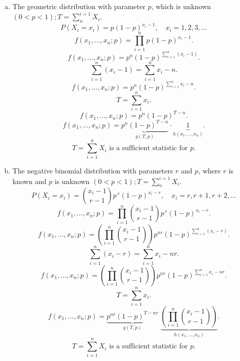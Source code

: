\documentclass{article}
\begin{document}
\begin{enumerate}[(a)]
	      \[
		      f(x_1,\dots,x_n; p)
		      =
		      \underbrace{p^{T}(1-p)^{n-T}}_{g(T,p)}
		      \cdot
		      \underbrace{1}_{h(x_1,\dots,x_n)}.
	      \]
	      \[
		      \boxed{
			      T = \sum_{i=1}^{n} X_i
			      \text{ is a sufficient statistic for } p.
		      }
	      \]
	\item The geometric distribution with parameter $p$, which is unknown $(0<p<1); T= \sum_{n}^{i=1}X_i$.
	      \[
		      P(X_i = x_i) = p(1-p)^{x_i-1},
		      \quad x_i = 1,2,3,\dots
	      \]
	      \[
		      f(x_1,\dots,x_n; p)
		      = \prod_{i=1}^{n} p(1-p)^{x_i-1}.
	      \]
	      \[
		      f(x_1,\dots,x_n; p)
		      = p^n (1-p)^{\sum_{i=1}^{n} (x_i - 1)}.
	      \]
	      \[
		      \sum_{i=1}^{n} (x_i - 1)
		      = \sum_{i=1}^{n} x_i - n.
	      \]
	      \[
		      f(x_1,\dots,x_n; p)
		      = p^n (1-p)^{\sum_{i=1}^{n} x_i - n}.
	      \]
	      \[
		      T = \sum_{i=1}^{n} x_i.
	      \]
	      \[
		      f(x_1,\dots,x_n; p)
		      = p^n (1-p)^{T-n}.
	      \]
	      \[
		      f(x_1,\dots,x_n; p)
		      =
		      \underbrace{p^n (1-p)^{T-n}}_{g(T,p)}
		      \cdot
		      \underbrace{1}_{h(x_1,\dots,x_n)}.
	      \]
	      \[
		      \boxed{
			      T = \sum_{i=1}^{n} X_i
			      \text{ is a sufficient statistic for } p.
		      }
	      \]
	\item The negative binomial distribution with parameters $r$ and $p$, where $r$ is known and $p$
	      is unknown $(0<p<1); T = \sum_{n}^{i = 1}X_i$.
	      \[
		      P(X_i = x_i)
		      = \binom{x_i-1}{r-1} p^{\,r}(1-p)^{x_i-r},
		      \quad x_i = r, r+1, r+2, \dots
	      \]
	      \[
		      f(x_1,\dots,x_n; p)
		      = \prod_{i=1}^{n}
		      \binom{x_i-1}{r-1}
		      p^{\,r}(1-p)^{x_i-r}.
	      \]
	      \[
		      f(x_1,\dots,x_n; p)
		      =
		      \left( \prod_{i=1}^{n}
		      \binom{x_i-1}{r-1} \right)
		      p^{nr}
		      (1-p)^{\sum_{i=1}^{n} (x_i-r)}.
	      \]
	      \[
		      \sum_{i=1}^{n} (x_i-r)
		      = \sum_{i=1}^{n} x_i - nr.
	      \]
	      \[
		      f(x_1,\dots,x_n; p)
		      =
		      \left( \prod_{i=1}^{n}
		      \binom{x_i-1}{r-1} \right)
		      p^{nr}
		      (1-p)^{\sum_{i=1}^{n} x_i - nr}.
	      \]
	      \[
		      T = \sum_{i=1}^{n} x_i.
	      \]
	      \[
		      f(x_1,\dots,x_n; p)
		      =
		      \underbrace{
			      p^{nr}(1-p)^{T-nr}
		      }_{g(T,p)}
		      \;
		      \underbrace{
			      \left( \prod_{i=1}^{n}
			      \binom{x_i-1}{r-1} \right)
		      }_{h(x_1,\dots,x_n)}.
	      \]
	      \[
		      \boxed{
			      T = \sum_{i=1}^{n} X_i
			      \text{ is a sufficient statistic for } p.
}\]
\end{enumerate}
\end{document}
